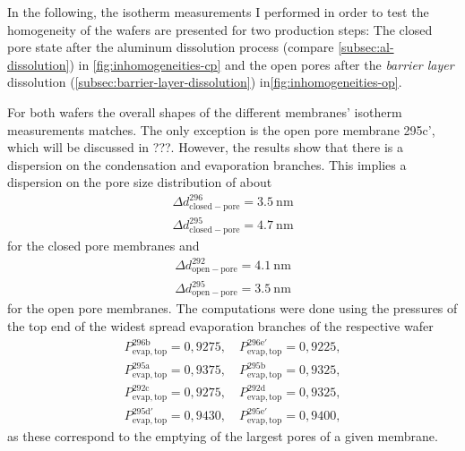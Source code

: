 \documentclass[../thesis.tex]{subfiles}
\begin{document}
        In the following, the isotherm measurements I performed in order to test the homogeneity of the wafers are presented for two production steps: The closed pore state after the aluminum dissolution process (compare \cref{subsec:al-dissolution}) in \cref{fig:inhomogeneities-cp} and the open pores after the \textit{barrier layer} dissolution (\cref{subsec:barrier-layer-dissolution}) in\cref{fig:inhomogeneities-op}.

        For both wafers the overall shapes of the different membranes' isotherm measurements matches. The only exception is the open pore membrane 295c', which will be discussed in ???. However, the results show that there is a dispersion on the condensation and evaporation branches. This implies a dispersion on the pore size distribution of about
        \begin{align*}
          \Delta d_\mathrm{closed-pore}^\mathrm{296} = \SI{3,5}{\nano\meter} \\
          \Delta d_\mathrm{closed-pore}^\mathrm{295} = \SI{4,7}{\nano\meter}
        \end{align*}
        for the closed pore membranes and
        \begin{align*}
          \Delta d_\mathrm{open-pore}^\mathrm{292} = \SI{4,1}{\nano\meter} \\
          \Delta d_\mathrm{open-pore}^\mathrm{295} = \SI{3,5}{\nano\meter}
        \end{align*}
        for the open pore membranes. The computations were done using the pressures of the top end of the widest spread evaporation branches of the respective wafer
        \begin{align*}
          P_\mathrm{evap,top}^\mathrm{296b}=0,9275,\quad P_\mathrm{evap,top}^\mathrm{296e'}=0,9225, \\
          P_\mathrm{evap,top}^\mathrm{295a}=0,9375,\quad P_\mathrm{evap,top}^\mathrm{295b}=0,9325, \\
          P_\mathrm{evap,top}^\mathrm{292c}=0,9275,\quad P_\mathrm{evap,top}^\mathrm{292d}=0,9325, \\
          P_\mathrm{evap,top}^\mathrm{295d'}=0,9430,\quad P_\mathrm{evap,top}^\mathrm{295e'}=0,9400,
        \end{align*}
        as these correspond to the emptying of the largest pores of a given membrane.
        \medskip
\end{document}
